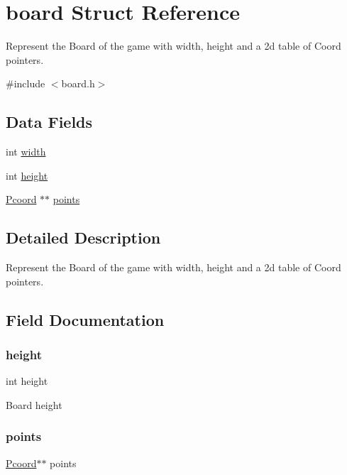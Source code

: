 \hypertarget{structboard}{}\section{board Struct Reference}
\label{structboard}


Represent the Board of the game with width, height and a 2d table of Coord pointers.  




{\ttfamily \#include $<$board.\+h$>$}

\subsection*{Data Fields}
\begin{DoxyCompactItemize}
\item 
int \hyperlink{structboard_a2474a5474cbff19523a51eb1de01cda4}{width}
\item 
int \hyperlink{structboard_ad12fc34ce789bce6c8a05d8a17138534}{height}
\item 
\hyperlink{board_8h_ab8cc720589a392832ddcc5e65efcbb47}{Pcoord} $\ast$$\ast$ \hyperlink{structboard_a8c2f9ff4e64bb7766dbb8623d7326433}{points}
\end{DoxyCompactItemize}


\subsection{Detailed Description}
Represent the Board of the game with width, height and a 2d table of Coord pointers. 

\subsection{Field Documentation}
\mbox{\label{structboard_ad12fc34ce789bce6c8a05d8a17138534}} 
\subsubsection{\texorpdfstring{height}{height}}
{\footnotesize\ttfamily int height}

Board height \mbox{\label{structboard_a8c2f9ff4e64bb7766dbb8623d7326433}} 
\subsubsection{\texorpdfstring{points}{points}}
{\footnotesize\ttfamily \hyperlink{board_8h_ab8cc720589a392832ddcc5e65efcbb47}{Pcoord}$\ast$$\ast$ points}

